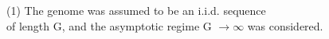 \documentclass[preview]{standalone}
\begin{document}
\begin{center}
(1) The genome was assumed to be an i.i.d. sequence\\ of length G, and the asymptotic regime G $\rightarrow \infty$ was considered.
\end{center}
\end{document}
